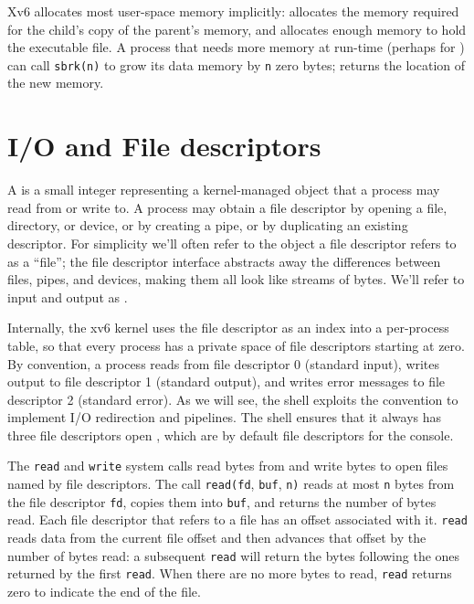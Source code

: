 Xv6 allocates most user-space memory
implicitly:
allocates the memory required for the child's copy of the
parent's memory, and 
allocates enough memory to hold the executable file.
A process that needs more memory at run-time (perhaps for
)
can call
\lstinline{sbrk(n)}
to grow its data memory by
\lstinline{n} zero
bytes;
returns the location of the new memory.

\section{I/O and File descriptors}

A 
is a small integer representing a kernel-managed object
that a process may read from or write to.
A process may obtain a file descriptor by opening a file, directory,
or device, or by creating a pipe, or by duplicating an existing
descriptor.
For simplicity we'll often refer to the object a file descriptor
refers to as a ``file'';
the file descriptor interface abstracts away the differences between
files, pipes, and devices, making them all look like streams of bytes.
We'll refer to input and output as .

Internally, the xv6 kernel uses the file descriptor
as an index into a per-process table,
so that every process has a private space of file descriptors
starting at zero.
By convention, a process reads from file descriptor 0 (standard input),
writes output to file descriptor 1 (standard output), and
writes error messages to file descriptor 2 (standard error).
As we will see, the shell exploits the convention to implement I/O redirection
and pipelines. The shell ensures that it always has three file descriptors
open
,
which are by default file descriptors for the console.

The
\lstinline{read}
and
\lstinline{write}
system calls read bytes from and write bytes to
open files named by file descriptors.
The call
\lstinline{read(fd},
\lstinline{buf},
\lstinline{n)}
reads at most
\lstinline{n}
bytes from the file descriptor
\lstinline{fd},
copies them into
\lstinline{buf},
and returns the number of bytes read.
Each file descriptor that refers to a file
has an offset associated with it.
\lstinline{read}
reads data from the current file offset and then advances
that offset by the number of bytes read:
a subsequent
\lstinline{read}
will return the bytes following the ones returned by the first
\lstinline{read}.
When there are no more bytes to read,
\lstinline{read}
returns zero to indicate the end of the file.

